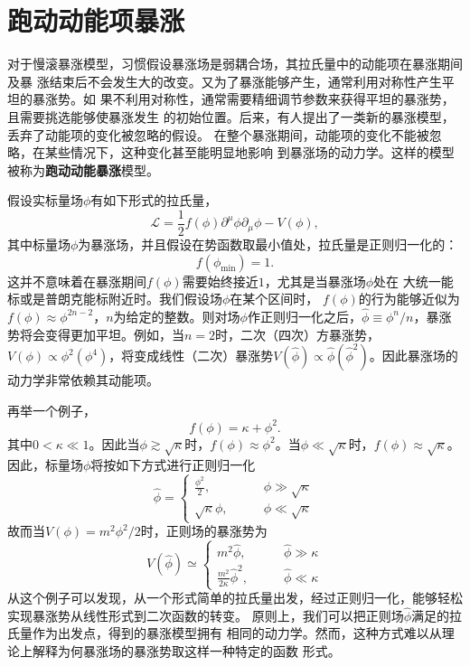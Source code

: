 \section{跑动动能项暴涨}
对于慢滚暴涨模型，习惯假设暴涨场是弱耦合场，其拉氏量中的动能项在暴涨期间及暴
涨结束后不会发生大的改变。又为了暴涨能够产生，通常利用对称性产生平坦的暴涨势。如
果不利用对称性，通常需要精细调节参数来获得平坦的暴涨势，且需要挑选能够使暴涨发生
的初始位置。后来，有人提出了一类新的暴涨模型，丢弃了动能项的变化被忽略的假设。
在整个暴涨期间，动能项的变化不能被忽略，在某些情况下，这种变化甚至能明显地影响
到暴涨场的动力学。这样的模型被称为\textbf{跑动动能暴涨}模型。

假设实标量场$\phi$有如下形式的拉氏量，
\begin{equation}
  \mathcal{L} =
  \frac{1}{2}f(\phi)\partial^{\mu}\phi\partial_{\mu}\phi-V(\phi),
\end{equation}
其中标量场$\phi$为暴涨场，并且假设在势函数取最小值处，拉氏量是正则归一化的：
\begin{equation}
  f(\phi_{\min})=1. 
\end{equation}
这并不意味着在暴涨期间$f(\phi)$需要始终接近$1$，尤其是当暴涨场$\phi$处在
大统一能标或是普朗克能标附近时。我们假设场$\phi$在某个区间时，
$f(\phi)$的行为能够近似为$f(\phi)\approx
\phi^{2n-2}$，$n$为给定的整数。则对场$\phi$作正则归一化之后，$\hat{\phi}\equiv
\phi^{n}/n$，暴涨势将会变得更加平坦。例如，当$n=2$时，二次（四次）方暴涨势，$V(\phi)\propto
\phi^2(\phi^{4})$，将变成线性（二次）暴涨势$V(\hat{\phi})\propto
\hat{\phi}(\hat{\phi}^2)$。因此暴涨场的动力学非常依赖其动能项。

再举一个例子，
\begin{equation}
  f(\phi) = \kappa + \phi^2. 
\end{equation}
其中$0 < \kappa \ll 1$。因此当$\phi \gtrsim \sqrt{\kappa}$时，$f(\phi)
\approx \phi^2$。当$\phi \ll \sqrt{\kappa}$时，$f(\phi)\approx
\sqrt{\kappa}$。因此，标量场$\phi$将按如下方式进行正则归一化
\begin{equation}
  \hat{\phi} = 
  \begin{cases}
    \frac{\phi^2}{2}, \qquad & \phi \gg \sqrt{\kappa} \\
    \sqrt{\kappa}\phi,\qquad & \phi \ll \sqrt{\kappa}
  \end{cases}
\end{equation}
故而当$V(\phi)=m^2\phi^2/ 2$时，正则场的暴涨势为
\begin{equation}
  V(\hat{\phi}) \simeq 
  \begin{cases}
    m^2\hat{\phi},\qquad & \hat{\phi} \gg \kappa \\
    \frac{m^2}{2\kappa} \hat{\phi}^2,\qquad & \hat{\phi} \ll \kappa
  \end{cases}
\end{equation}
从这个例子可以发现，从一个形式简单的拉氏量出发，经过正则归一化，能够轻松实现暴涨势从线性形式到二次函数的转变。
原则上，我们可以把正则场$\hat{\phi}$满足的拉氏量作为出发点，得到的暴涨模型拥有
相同的动力学。然而，这种方式难以从理论上解释为何暴涨场的暴涨势取这样一种特定的函数
形式。


